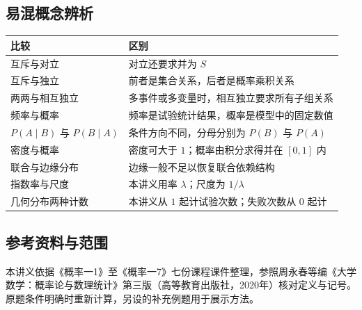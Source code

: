 \documentclass[UTF8,fontset=none,zihao=-4,a4paper]{ctexart}
\begin{document}
\subsection{易混概念辨析}
\begin{center}\begin{tabularx}{\linewidth}{l Y}\toprule
比较&区别\\\midrule
互斥与对立&对立还要求并为 $S$\\
互斥与独立&前者是集合关系，后者是概率乘积关系\\
两两与相互独立&多事件或多变量时，相互独立要求所有子组关系\\
频率与概率&频率是试验统计结果，概率是模型中的固定数值\\
$P(A\mid B)$ 与 $P(B\mid A)$&条件方向不同，分母分别为 $P(B)$ 与 $P(A)$\\
密度与概率&密度可大于 $1$；概率由积分求得并在 $[0,1]$ 内\\
联合与边缘分布&边缘一般不足以恢复联合依赖结构\\
指数率与尺度&本讲义用率 $\lambda$；尺度为 $1/\lambda$\\
几何分布两种计数&本讲义从 $1$ 起计试验次数；失败次数从 $0$ 起计\\\bottomrule
\end{tabularx}\end{center}
\subsection{参考资料与范围}
本讲义依据《概率一1》至《概率一7》七份课程课件整理，参照周永春等编《大学数学：概率论与数理统计》第三版（高等教育出版社，2020年）核对定义与记号。原题条件明确时重新计算，另设的补充例题用于展示方法。
\end{document}

